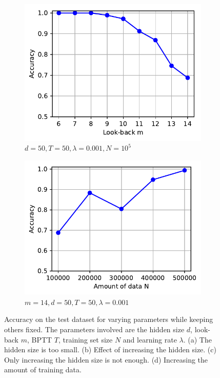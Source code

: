 \begin{figure}
		\\
		\begin{subfigure}[b]{0.5\linewidth}
			\includegraphics[width=\linewidth]{Images/Python-Plots/accuracy-vs-look-back2}
			\caption{
				$d = 50, T = 50, \lambda = 0.001, N = 10^5$
				\label{fig:accuracy-vs-look-back2}
			}
		\end{subfigure}%
		\begin{subfigure}[b]{0.5\linewidth}
			\includegraphics[width=\linewidth]{Images/Python-Plots/more-training-data}
			\caption{
				$m = 14, d = 50, T = 50, \lambda = 0.001$
				\label{fig:more-training-data}
			}
		\end{subfigure}
		\caption[Ablation study: Memorizing the past with the LSTM]
				{Accuracy on the test dataset for varying parameters while keeping others fixed. 
				 The parameters involved are the hidden size $d$, look-back $m$, BPTT $T$, training set size $N$ and learning rate $\lambda$. 
				 (a) The hidden size is too small.
				 (b) Effect of increasing the hidden size.
				 (c) Only increasing the hidden size is not enough.
				 (d) Increasing the amount of training data.}
		\label{fig:ablation-study-binary-memory}
	\end{figure}
	
	
	
	
